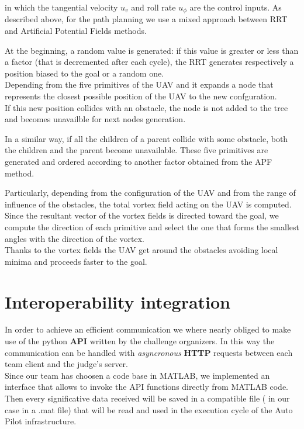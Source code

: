 \documentclass[oneside,onecolumn]{article}
\begin{document}
in which the tangential velocity $u_{v}$ and roll rate $u_{\phi}$ are the control inputs.
As described above, for the path planning we use a mixed approach
between RRT and Artificial Potential Fields methods.\\\par
At the beginning, a random value is generated:  if this value is greater or less
than a factor (that is decremented after each cycle), the RRT generates
respectively a position biased to the goal or a random one.\\
Depending from the five primitives of the UAV and it expands a node that
represents the closest possible position of the UAV to the new confguration.\\
If this new position collides with an obstacle, the node is not added to the
tree and becomes unavailble for next nodes generation.\\\par
In a similar way, if all the children of a parent collide with some obstacle,
both the children and the parent become unavailable.
These five primitives are generated and ordered according to another factor
obtained from the APF method.\\\par
Particularly, depending from the configuration of the UAV and from the range
of influence of the obstacles, the total vortex field acting on the UAV is computed.\\
Since the resultant vector of the vortex fields is directed toward the goal, we
compute the direction of each primitive and select the one that forms the
smallest angles with the direction of the vortex.\\
Thanks to the vortex fields the UAV get around the obstacles avoiding local
minima and proceeds faster to the goal.

\section{Interoperability integration}
In order to achieve an efficient communication we where nearly obliged to make
use of the python \textbf{API} written by the challenge organizers. In this way the
communication can be handled with \textit{asyncronous} \textbf{HTTP} requests between each team
client and the judge's server.\\
Since our team has choosen a code base in MATLAB, we implemented an interface
that allows to invoke the API functions directly from MATLAB code.\\
Then every significative data received will be saved in a compatible file ( in
our case in a .mat file) that will be read and used in the execution cycle of the Auto
Pilot infrastructure.
\end{document}
